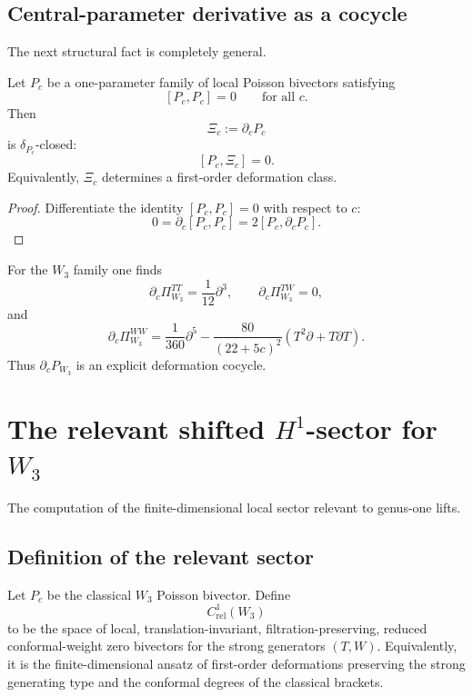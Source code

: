 \subsection{Central-parameter derivative as a cocycle}

The next structural fact is completely general.

\begin{theorem}\label{thm:parameter-cocycle}
Let $P_c$ be a one-parameter family of local Poisson bivectors satisfying
\[
[P_c,P_c]=0
\qquad\text{for all }c.
\]
Then
\[
\Xi_c:=\partial_c P_c
\]
is $\delta_{P_c}$-closed:
\[
[P_c,\Xi_c]=0.
\]
Equivalently, $\Xi_c$ determines a first-order deformation class.
\end{theorem}

\begin{proof}
Differentiate the identity $[P_c,P_c]=0$ with respect to $c$:
\[
0=\partial_c[P_c,P_c]=2[P_c,\partial_cP_c].
\]
\end{proof}

For the $W_3$ family one finds
\[
\partial_c \Pi^{TT}_{W_3}=\frac1{12}\partial^3,\qquad
\partial_c\Pi^{TW}_{W_3}=0,
\]
and
\[
\partial_c \Pi^{WW}_{W_3}
=
\frac1{360}\partial^5-\frac{80}{(22+5c)^2}(T^2\partial+T\partial T).
\]
Thus $\partial_c P_{W_3}$ is an explicit deformation cocycle.

\section{The relevant shifted $H^1$-sector for $W_3$}

The computation of the finite-dimensional local sector relevant to genus-one lifts.

\subsection{Definition of the relevant sector}

\begin{definition}
Let $P_c$ be the classical $W_3$ Poisson bivector. Define
\[
C^1_{\mathrm{rel}}(W_3)
\]
to be the space of local, translation-invariant, filtration-preserving, reduced conformal-weight
zero bivectors for the strong generators $(T,W)$. Equivalently, it is the finite-dimensional
ansatz of first-order deformations preserving the strong generating type and the conformal
degrees of the classical brackets.
\end{definition}

